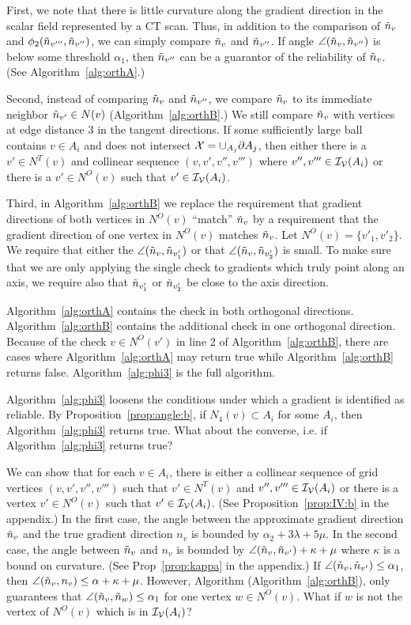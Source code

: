 First, we note that there is little curvature along the gradient direction
in the scalar field represented by a CT scan.
Thus, in addition to the comparison 
of $\tilde{n}_v$ and $\phi_2(\tilde{n}_{v'''},\tilde{n}_{v''})$,
we can simply compare $\tilde{n}_v$ and $\tilde{n}_{v''}$.
If angle $\angle(\tilde{n}_v,\tilde{n}_{v''})$ is below some threshold $\alpha_1$,
then $\tilde{n}_{v''}$ can be a guarantor of the reliability of $\tilde{n}_v$.
(See Algorithm~\ref{alg:orthA}.)

Second, instead of comparing $\tilde{n}_v$ and $\tilde{n}_{v''}$,
we compare $\tilde{n}_v$ to its immediate neighbor $\tilde{n}_{v'} \in N(v)$
(Algorithm~\ref{alg:orthB}.)
We still compare $\tilde{n}_v$ with vertices at edge distance 3
in the tangent directions.
If some sufficiently large ball contains $v \in A_i$
and does not intersect $\mathcal{X} = \cup_{A_j} \partial A_j$,
then either there is a $v' \in N^T(v)$ and collinear sequence $(v,v',v'',v''')$
where $v'',v''' \in \mathcal{I_V}(A_i)$
or there is a $v' \in N^O(v)$ such that $v' \in \mathcal{I_V}(A_i)$.

Third, in Algorithm~\ref{alg:orthB}
we replace the requirement that gradient directions 
of both vertices in $N^O(v)$ ``match'' $\tilde{n}_v$
by a requirement that the gradient direction of one vertex
in $N^O(v)$ matches $\tilde{n}_v$.
Let $N^O(v) = \{v'_1, v'_2\}$.
We require that either the $\angle(\tilde{n}_v, \tilde{n}_{v'_1})$ 
or that $\angle(\tilde{n}_v, \tilde{n}_{v'_2})$  is small.
To make sure that we are only applying the single check
to gradients which truly point along an axis,
we require also that $\tilde{n}_{v'_1}$ or $\tilde{n}_{v'_2}$
be close to the axis direction.

Algorithm~\ref{alg:orthA} contains the check
in both orthogonal directions.
Algorithm~\ref{alg:orthB} contains the additional check 
in one orthogonal direction.
Because of the check $v \in N^O(v')$ in line 2 of Algorithm~\ref{alg:orthB},
there are cases where Algorithm~\ref{alg:orthA} may return true
while Algorithm~\ref{alg:orthB} returns false.
Algorithm~\ref{alg:phi3} is the full algorithm.

Algorithm~\ref{alg:phi3} loosens the conditions 
under which a gradient is identified as reliable.
By Proposition~\ref{prop:angle:b},
if $N_4(v) \subset A_i$ for some $A_i$,
then Algorithm~\ref{alg:phi3} returns true.
What about the converse, i.e. if Algorithm~\ref{alg:phi3} returns true?

We can show that for each $v \in A_i$,
there is either a collinear sequence of grid vertices $(v,v',v'',v''')$
such that $v' \in N^T(v)$ and $v'',v''' \in \mathcal{I_V}(A_i)$
or there is a vertex $v' \in N^O(v)$ such that $v' \in \mathcal{I_V}(A_i)$.
(See Proposition~\ref{prop:IV:b} in the appendix.)
In the first case,
the angle between the approximate gradient direction $\tilde{n}_v$
and the true gradient direction $n_v$ is bounded 
by $\alpha_2 + 3\lambda + 5 \mu$.
In the second case,
the angle between $\tilde{n}_v$ and $n_v$ is bounded by
$\angle(\tilde{n}_v,\tilde{n}_{v'}) + \kappa + \mu$
where $\kappa$ is a bound on curvature.
(See Prop~\ref{prop:kappa} in the appendix.)
If $\angle(\tilde{n}_v,\tilde{n}_{v'}) \le \alpha_1$,
then $\angle(\tilde{n}_v,n_v) \le \alpha + \kappa + \mu$.
However, Algorithm \DoesOrthMatchB (Algorithm~\ref{alg:orthB}),
only guarantees that $\angle(\tilde{n}_v, \tilde{n}_w) \le \alpha_1$
for one vertex $w \in N^O(v)$.
What if $w$ is not the vertex of $N^O(v)$ which is in $\mathcal{I_V}(A_i)$?

